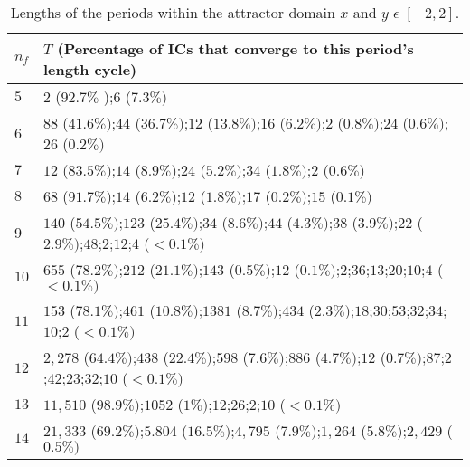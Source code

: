 \begin{table}[!t]
\renewcommand{\arraystretch}{1.3}

\caption{Lengths of the periods within the attractor domain $x$ and $y$ $\epsilon$  $[-2,2]$.}
\label{tabla}
\centering
\fontsize{9}{9}\selectfont
\begin{tabular}{l  l  }
\hline
$n_f$ & $T$ {\scriptsize(Percentage of ICs that converge to this period's length cycle)}  \\
\hline
\hline
$5$ & $2$ {\scriptsize($92.7\%$ )};$6$  {\scriptsize($7.3\% )$}\\
$6$ & $88$ {\scriptsize($41.6 \% )$};$44$ {\scriptsize($36.7 \% )$};$12$ {\scriptsize($13.8\% )$};$16$ {\scriptsize($6.2 \% )$};$2$ {\scriptsize($0.8 \% )$};$24$ {\scriptsize($0.6 \% )$};$26$ {\scriptsize($0.2 \%)$}\\
$7$ &  $12$ {\scriptsize($83.5 \% )$};$14$ {\scriptsize($8.9\% )$};$24$ {\scriptsize($5.2\% )$};$34$ {\scriptsize($1.8 \% )$};$2$ {\scriptsize($0.6\% )$} \\
$8$ & $68$ {\scriptsize($91.7\%)$};$14$ {\scriptsize($6.2\%)$};$12$ {\scriptsize($1.8 \%)$};$17$ {\scriptsize($0.2\% )$};$15$ {\scriptsize($0.1 \%)$}\\ 
$9$ & $140$ {\scriptsize($54.5 \%)$};$123$ {\scriptsize($25.4 \%)$};$34$ {\scriptsize($8.6\%)$};$44$ {\scriptsize($4.3 \%)$};$38$ {\scriptsize($3.9 \%)$};$22$ {\scriptsize($2.9 \%)$};$48$;$2$;$12$;$4$ {\scriptsize($<0.1\%)$}\\
$10$ & $655$ {\scriptsize($78.2\%)$};$212$ {\scriptsize($21.1\%)$};$143$ {\scriptsize($0.5\%)$};$12$ {\scriptsize($0.1\%)$};$2$;$36$;$13$;$20$;$10$;$4$ {\scriptsize($<0.1\%)$}\\
$11$ & $153$ {\scriptsize($78.1\%)$};$461$ {\scriptsize($10.8\% )$};$1381$ {\scriptsize($8.7\%)$};$434$ {\scriptsize($2.3\%)$};$18$;$30$;$53$;$32$;$34$;$10$;$2$ {\scriptsize($<0.1\% )$}\\
$12$ & $2,278$ {\scriptsize($64.4\%)$};$438$ {\scriptsize($22.4\% )$};$598$ {\scriptsize($7.6\% )$};$886$ {\scriptsize($4.7 \%)$};$12$ {\scriptsize($0.7\%)$};$87$;$2$;$42$;$23$;$32$;$10$ {\scriptsize($<0.1\% )$}\\
$13$ & $11,510$ {\scriptsize($ 98.9\%)$};$1052$ {\scriptsize($1 \%)$};$12$;$26$;$2$;$10$ {\scriptsize($<0.1\% )$}\\
$14$ & $21,333$ {\scriptsize($69.2\% )$};$5.804$ {\scriptsize($16.5\%  )$};$4,795$ {\scriptsize($7.9\%  )$};$1,264$ {\scriptsize($5.8 \% )$};$2,429$ {\scriptsize($0.5\% )$}\\ 

\end{tabular}
\end{table}
